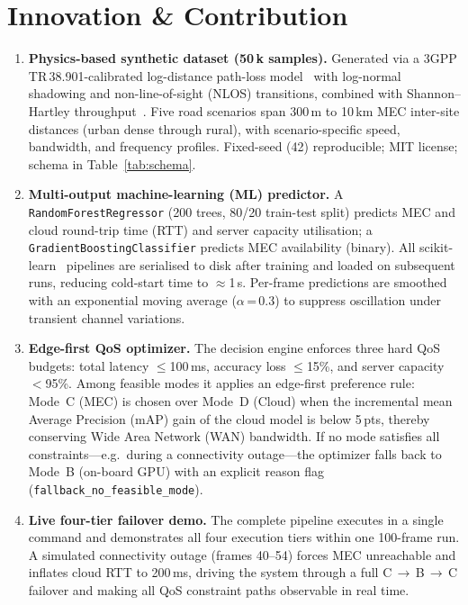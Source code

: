 \documentclass[10pt,conference]{IEEEtran}
\begin{document}
\section{Innovation \& Contribution}

\begin{enumerate}
  \item \textbf{Physics-based synthetic dataset (50\,k samples).}
        Generated via a 3GPP TR\,38.901-calibrated log-distance path-loss
        model~\cite{3gpp38901} with log-normal shadowing and non-line-of-sight
        (NLOS) transitions, combined with Shannon--Hartley
        throughput~\cite{shannon1948}.  Five road scenarios span 300\,m
        to 10\,km MEC inter-site distances (urban dense through rural),
        with scenario-specific speed, bandwidth, and frequency profiles.
        Fixed-seed (42) reproducible; MIT license; schema in
        Table~\ref{tab:schema}.

  \item \textbf{Multi-output machine-learning (ML) predictor.}
        A \texttt{RandomForestRegressor} (200 trees, 80/20 train-test split)
        predicts MEC and cloud round-trip time (RTT) and server capacity
        utilisation; a \texttt{GradientBoostingClassifier} predicts MEC
        availability (binary).  All scikit-learn~\cite{sklearn} pipelines are
        serialised to disk after training and loaded on subsequent runs,
        reducing cold-start time to $\approx$1\,s.  Per-frame predictions are
        smoothed with an exponential moving average ($\alpha$\,=\,0.3) to
        suppress oscillation under transient channel variations.

  \item \textbf{Edge-first QoS optimizer.}
        The decision engine enforces three hard QoS budgets: total latency
        $\leq$100\,ms, accuracy loss $\leq$15\%, and server capacity
        $<$95\%.  Among feasible modes it applies an edge-first preference
        rule: Mode~C (MEC) is chosen over Mode~D (Cloud) when the
        incremental mean Average Precision (mAP) gain of the cloud model is
        below 5\,pts, thereby conserving Wide Area Network (WAN) bandwidth.
        If no mode satisfies all constraints---e.g.\ during a connectivity
        outage---the optimizer falls back to Mode~B (on-board GPU) with an
        explicit reason flag (\texttt{fallback\_no\_feasible\_mode}).

  \item \textbf{Live four-tier failover demo.}
        The complete pipeline executes in a single command and demonstrates
        all four execution tiers within one 100-frame run.  A simulated
        connectivity outage (frames 40--54) forces MEC unreachable and
        inflates cloud RTT to 200\,ms, driving the system through a full
        C\,$\to$\,B\,$\to$\,C failover and making all QoS constraint paths
        observable in real time.
\end{enumerate}
\end{document}
